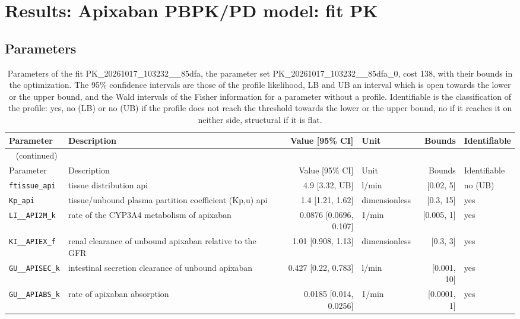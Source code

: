 \section{Results: Apixaban PBPK/PD model: fit PK}

\subsection{Parameters}

\begin{longtable}{llrlrl}
\caption{Parameters of the fit PK\_20261017\_103232\_\_85dfa, the parameter set PK\_20261017\_103232\_\_85dfa\_0, cost 138, with their bounds in the optimization. The 95\% confidence intervals are those of the profile likelihood, LB and UB an interval which is open towards the lower or the upper bound, and the Wald intervals of the Fisher information for a parameter without a profile. Identifiable is the classification of the profile: yes, no (LB) or no (UB) if the profile does not reach the threshold towards the lower or the upper bound, no if it reaches it on neither side, structural if it is flat.}\label{tab:parameters:PK_20261017_103232__85dfa} \\
\toprule
Parameter & Description & Value [95\% CI] & Unit & Bounds & Identifiable \\
\midrule
\endfirsthead
\multicolumn{6}{l}{\small\tablename~\thetable{} (continued)} \\
\toprule
Parameter & Description & Value [95\% CI] & Unit & Bounds & Identifiable \\
\midrule
\endhead
\bottomrule
\endlastfoot
\texttt{ftissue\_api} & tissue distribution api & 4.9 [3.32, UB] & l/min & [0.02, 5] & no (UB) \\
\texttt{Kp\_api} & tissue/unbound plasma partition coefficient (Kp,u) api & 1.4 [1.21, 1.62] & dimensionless & [0.3, 15] & yes \\
\texttt{LI\_\_API2M\_k} & rate of the CYP3A4 metabolism of apixaban & 0.0876 [0.0696, 0.107] & 1/min & [0.005, 1] & yes \\
\texttt{KI\_\_APIEX\_f} & renal clearance of unbound apixaban relative to the GFR & 1.01 [0.908, 1.13] & dimensionless & [0.3, 3] & yes \\
\texttt{GU\_\_APISEC\_k} & intestinal secretion clearance of unbound apixaban & 0.427 [0.22, 0.783] & l/min & [0.001, 10] & yes \\
\texttt{GU\_\_APIABS\_k} & rate of apixaban absorption & 0.0185 [0.014, 0.0256] & 1/min & [0.0001, 1] & yes \\

\end{longtable}
